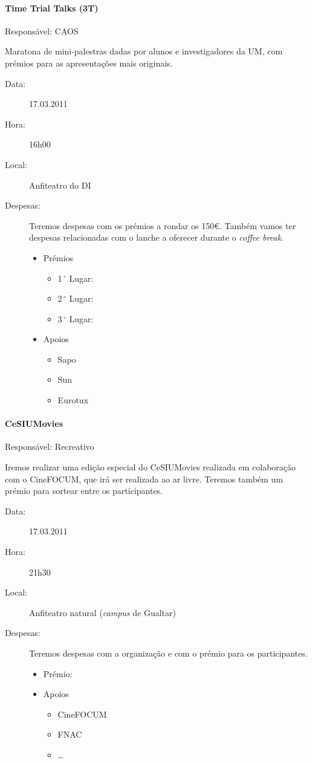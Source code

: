 \paragraph{Time Trial Talks (3T)}
Responsável: CAOS

Maratona de mini-palestras dadas por alunos e investigadores da UM, com prémios para as apresentações mais originais.

\begin{description}
	\item[Data:] 17.03.2011
	\item[Hora:] 16h00
	\item[Local:] Anfiteatro do DI
	\item[Despesas:] Teremos despesas com os prémios a rondar os 150\euro. Também vamos ter despesas relacionadas com o lanche a oferecer durante o \emph{coffee break}.
		\begin{itemize}
		\item Prémios
		\begin{itemize}
			\item 1$\,^{\circ}$ Lugar:
			\item 2$\,^{\circ}$ Lugar:
			\item 3$\,^{\circ}$ Lugar:
		\end{itemize}
		\item Apoios
		\begin{itemize}
			\item Sapo
			\item Sun
			\item Eurotux
		\end{itemize}
	\end{itemize}
\end{description}



\paragraph{CeSIUMovies}
Responsável: Recreativo

Iremos realizar uma edição especial do CeSIUMovies realizada em colaboração com o CineFOCUM, que irá ser realizada ao ar livre. Teremos também um prémio para sortear entre os participantes.

\begin{description}
	\item[Data:] 17.03.2011
	\item[Hora:] 21h30
	\item[Local:] Anfiteatro natural (\emph{campus} de Gualtar)
	\item[Despesas:] Teremos despesas com a organização e com o prémio para os participantes.
	\begin{itemize}
		\item Prémio:
		\item Apoios
		\begin{itemize}
			\item CineFOCUM
			\item FNAC
			\item \dots
		\end{itemize}
	\end{itemize}
\end{description}

